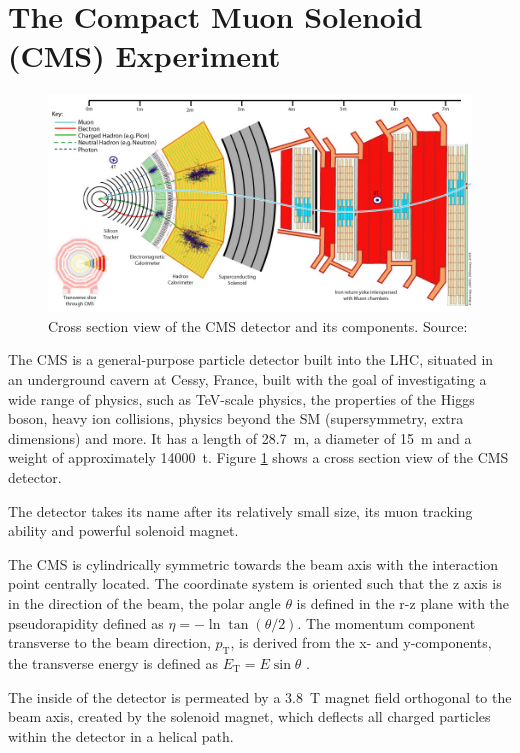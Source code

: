 \section{The Compact Muon Solenoid (CMS) Experiment}
\begin{figure}[!b]
    \centering
    \includegraphics[width=15cm]{assets/chap02/cms.jpeg}
    \caption{Cross section view of the CMS detector and its components. Source: \cite{Davis:2205172}}
    \label{fig:cms}
\end{figure}
The CMS is a general-purpose particle detector built into the LHC, situated in an underground cavern at Cessy, France, built with the goal of investigating a wide range of physics, such as TeV-scale physics, the properties of the Higgs boson, heavy ion collisions, physics beyond the SM (supersymmetry, extra dimensions) and more. It has a length of \SI{28.7}{m}, a diameter of \SI{15}{m} and a weight of approximately \SI{14000}{t}. Figure \ref{fig:cms} shows a cross section view of the CMS detector.

The detector takes its name after its relatively small size, its muon tracking ability and powerful solenoid magnet.

The CMS is cylindrically symmetric towards the beam axis with the interaction point centrally located. The coordinate system is oriented such that the z axis is in the direction of the beam, the polar angle $\theta$ is defined in the r-z plane with the pseudorapidity defined as $\eta=-\ln{\tan{(\theta / 2)}}$. The momentum component transverse to the beam direction, $p_{\text{T}}$, is derived from the x- and y-components, the transverse energy is defined as $E_{\text{T}}=E \sin{\theta}$ \cite{Spannagel2017}.

The inside of the detector is permeated by a \SI{3.8}{T} magnet field orthogonal to the beam axis, created by the solenoid magnet, which deflects all charged particles within the detector in a helical path.

